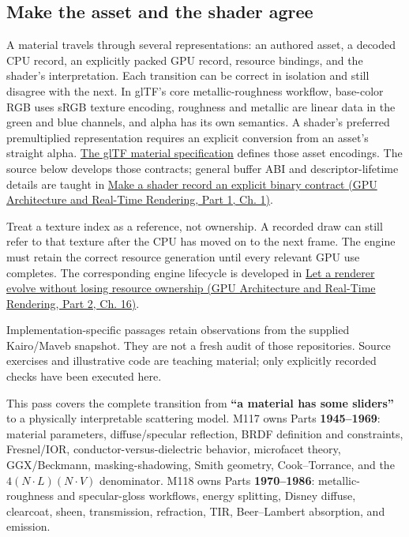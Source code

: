 \subsection{Make the asset and the shader agree}\label{03-visual-computing-i-ch005-make-the-asset-and-the-shader-agree}

\hypertarget{03-visual-computing-i-ch005-make-the-asset-and-the-shader-agree}{}

A material travels through several representations: an authored asset, a decoded CPU record, an explicitly packed GPU record, resource bindings, and the shader's interpretation. Each transition can be correct in isolation and still disagree with the next. In glTF's core metallic-roughness workflow, base-color RGB uses sRGB texture encoding, roughness and metallic are linear data in the green and blue channels, and alpha has its own semantics. A shader's preferred premultiplied representation requires an explicit conversion from an asset's straight alpha. \href{https://raw.githubusercontent.com/KhronosGroup/glTF/main/specification/2.0/Specification.adoc}{The glTF material specification} defines those asset encodings. The source below develops those contracts; general buffer ABI and descriptor-lifetime details are taught in \href{../06-GPU-Architecture-and-Real-Time-Rendering-P01/main.pdf\#01-foundations-i-ch008-make-a-shader-record-an-explicit-binary-contract}{Make a shader record an explicit binary contract (GPU Architecture and Real-Time Rendering, Part 1, Ch. 1)}.

Treat a texture index as a reference, not ownership. A recorded draw can still refer to that texture after the CPU has moved on to the next frame. The engine must retain the correct resource generation until every relevant GPU use completes. The corresponding engine lifecycle is developed in \href{../06-GPU-Architecture-and-Real-Time-Rendering-P02/main.pdf\#06-engine-ii-ch025-let-a-renderer-evolve-without-losing-resource-ownership}{Let a renderer evolve without losing resource ownership (GPU Architecture and Real-Time Rendering, Part 2, Ch. 16)}.

Implementation-specific passages retain observations from the supplied Kairo/Maveb snapshot. They are not a fresh audit of those repositories. Source exercises and illustrative code are teaching material; only explicitly recorded checks have been executed here.

This pass covers the complete transition from \textbf{``a material has some sliders''} to a physically interpretable scattering model. M117 owns Parts \textbf{1945--1969}: material parameters, diffuse/specular reflection, BRDF definition and constraints, Fresnel/IOR, conductor-versus-dielectric behavior, microfacet theory, GGX/Beckmann, masking-shadowing, Smith geometry, Cook--Torrance, and the \(4(N\!\cdot L)(N\!\cdot V)\) denominator. M118 owns Parts \textbf{1970--1986}: metallic-roughness and specular-gloss workflows, energy splitting, Disney diffuse, clearcoat, sheen, transmission, refraction, TIR, Beer--Lambert absorption, and emission.

